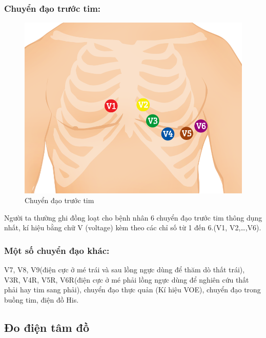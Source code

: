 \subsubsection{Chuyển đạo trước tim:}
\begin{center}
    \begin{figure}[htp]
    \begin{center}
    \includegraphics[scale=.25]{image/week1/chuyendaotruocnguc.png}
    \end{center}
    \caption{Chuyển đạo trước tim }
    \end{figure}
\end{center}
Người ta thường ghi đồng loạt cho bệnh nhân 6 chuyển đạo trước tim thông dụng nhất, kí hiệu bằng chữ V (voltage) kèm theo các chỉ số từ 1 đến 6.(V1, V2,…,V6).

\subsubsection{Một số chuyển đạo khác:}
V7, V8, V9(điện cực ở mé trái và sau lồng ngực dùng để thăm dò thất trái), V3R, V4R, V5R, V6R(điện cực ở mé phải lồng ngực dùng để nghiên cứu thất phải hay tim sang phải), chuyển đạo thực quản (Kí hiệu VOE), chuyển đạo trong buồng tim, điện đồ His.

\subsection{Đo điện tâm đồ}
